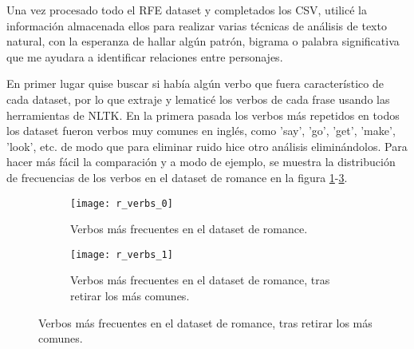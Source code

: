 \documentclass{pre-tfg}
\begin{document}
\begin{table}[]
	\caption{Estructura de \textit{fic\_characters.csv}}
	\label{table:fic_characters}
\end{table}

Una vez procesado todo el RFE dataset y completados los CSV, utilicé la información almacenada ellos para realizar varias técnicas de análisis de texto natural, con la esperanza de hallar algún patrón, bigrama o palabra significativa que me ayudara a identificar relaciones entre personajes.

En primer lugar quise buscar si había algún verbo que fuera característico de cada dataset, por lo que extraje y lematicé los verbos de cada frase usando las herramientas de NLTK. En la primera pasada los verbos más repetidos en todos los dataset fueron verbos muy comunes en inglés, como 'say', 'go', 'get', 'make', 'look', etc. de modo que para eliminar ruido hice otro análisis eliminándolos. Para hacer más fácil la comparación y a modo de ejemplo, se muestra la distribución de frecuencias de los verbos en el dataset de romance en la figura \ref{fig:r_verbs}-\ref{fig:r_verbs_removed}.


\begin{figure}[h!]
	\centering
	\begin{subfigure}{\textwidth}
		\texttt{[image: r\_verbs\_0]}
		\caption{Verbos más frecuentes en el dataset de romance.}
		\label{fig:r_verbs}
		
	\end{subfigure}
	\begin{subfigure}{\textwidth}
		\texttt{[image: r\_verbs\_1]}
		\caption{Verbos más frecuentes en el dataset de romance, tras retirar los más comunes.}
		\label{fig:r_verbs_removed}
	\end{subfigure}
	
	
\end{figure}
\end{document}
